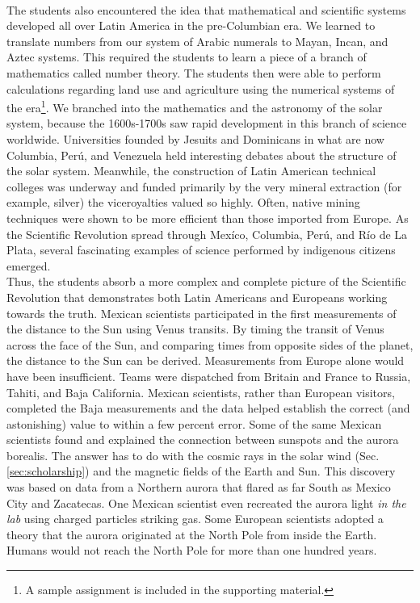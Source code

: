 \documentclass[../../../main.tex]{subfiles}
\begin{document}
\\
\vspace{0.25cm}
The students also encountered the idea that mathematical and scientific systems developed all over Latin America in the pre-Columbian era.  We learned to translate numbers from our system of Arabic numerals to Mayan, Incan, and Aztec systems.  This required the students to learn a piece of a branch of mathematics called number theory.  The students then were able to perform calculations regarding land use and agriculture using the numerical systems of the era\footnote{A sample assignment is included in the supporting material.}.  We branched into the mathematics and the astronomy of the solar system, because the 1600s-1700s saw rapid development in this branch of science worldwide.  Universities founded by Jesuits and Dominicans in what are now Columbia, Per\'{u}, and Venezuela held interesting debates about the structure of the solar system.  Meanwhile, the construction of Latin American technical colleges was underway and funded primarily by the very mineral extraction (for example, silver) the viceroyalties valued so highly.  Often, native mining techniques were shown to be more efficient than those imported from Europe.  As the Scientific Revolution spread through Mex\'{i}co, Columbia, Per\'{u}, and R\'{i}o de La Plata, several fascinating examples of science performed by indigenous citizens emerged.
\\
\vspace{0.25cm}
Thus, the students absorb a more complex and complete picture of the Scientific Revolution that demonstrates both Latin Americans and Europeans working towards the truth. Mexican scientists participated in the first measurements of the distance to the Sun using Venus transits.  By timing the transit of Venus across the face of the Sun, and comparing times from opposite sides of the planet, the distance to the Sun can be derived.  Measurements from Europe alone would have been insufficient.  Teams were dispatched from Britain and France to Russia, Tahiti, and Baja California.  Mexican scientists, rather than European visitors, completed the Baja measurements and the data helped establish the correct (and astonishing) value to within a few percent error.  Some of the same Mexican scientists found and explained the connection between sunspots and the aurora borealis.  The answer has to do with the cosmic rays in the solar wind (Sec. \ref{sec:scholarship}) and the magnetic fields of the Earth and Sun.  This discovery was based on data from a Northern aurora that flared as far South as Mexico City and Zacatecas.  One Mexican scientist even recreated the aurora light \textit{in the lab} using charged particles striking gas.  Some European scientists adopted a theory that the aurora originated at the North Pole from inside the Earth.  Humans would not reach the North Pole for more than one hundred years.
\end{document}
